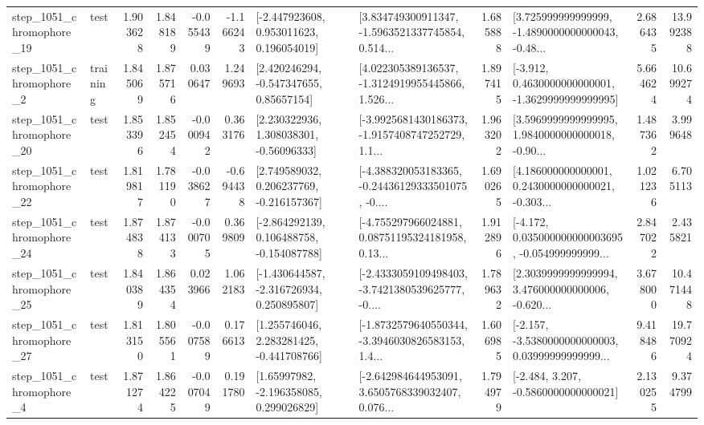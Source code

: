 \begin{tabular}{llrrrrllrlrr}
 step\_1051\_chromophore\_19 &      test &      1.903628 &    1.848189 &     -0.055439 & -1.166243 &    [-2.447923608, 0.953011623, 0.196054019] &  [3.834749300911347, -1.5963521337745854, 0.514... &       1.685888 &  [3.725999999999999, -1.4890000000000043, -0.48... &            2.686435 &         13.992388 \\
  step\_1051\_chromophore\_2 &  training &      1.845069 &    1.875716 &      0.030647 &  1.249693 &     [2.420246294, -0.547347655, 0.85657154] &  [4.022305389136537, -1.3124919955445866, 1.526... &       1.897415 &  [-3.912, 0.4630000000000001, -1.3629999999999995] &            5.664624 &         10.699274 \\
 step\_1051\_chromophore\_20 &      test &      1.853396 &    1.852454 &     -0.000942 &  0.363176 &     [2.230322936, 1.308038301, -0.56096333] &  [-3.9925681430186373, -1.9157408747252729, 1.1... &       1.963202 &  [3.5969999999999995, 1.9840000000000018, -0.90... &            1.487362 &          3.999648 \\
 step\_1051\_chromophore\_22 &      test &      1.819817 &    1.781190 &     -0.038627 & -0.694438 &    [2.749589032, 0.206237769, -0.216157367] &  [-4.388320053183365, -0.24436129333501075, -0.... &       1.690265 &  [4.186000000000001, 0.2430000000000021, -0.303... &            1.021236 &          6.705113 \\
 step\_1051\_chromophore\_24 &      test &      1.874838 &    1.874133 &     -0.000705 &  0.369809 &   [-2.864292139, 0.106488758, -0.154087788] &  [-4.755297966024881, 0.08751195324181958, 0.13... &       1.912896 &  [-4.172, 0.035000000000003695, -0.054999999999... &            2.847022 &          2.435821 \\
 step\_1051\_chromophore\_25 &      test &      1.840389 &    1.864354 &      0.023966 &  1.062183 &   [-1.430644587, -2.316726934, 0.250895807] &  [-2.4333059109498403, -3.7421380539625777, -0.... &       1.789632 &  [2.3039999999999994, 3.476000000000006, -0.620... &            3.678000 &         10.471448 \\
 step\_1051\_chromophore\_27 &      test &      1.813150 &    1.805561 &     -0.007589 &  0.176613 &    [1.255746046, 2.283281425, -0.441708766] &  [-1.8732579640550344, -3.3946030826583153, 1.4... &       1.606985 &  [-2.157, -3.5380000000000003, 0.03999999999999... &            9.418486 &         19.770924 \\
  step\_1051\_chromophore\_4 &      test &      1.871274 &    1.864225 &     -0.007049 &  0.191780 &     [1.65997982, -2.196358085, 0.299026829] &  [-2.642984644953091, 3.6505768339032407, 0.076... &       1.794979 &               [-2.484, 3.207, -0.5860000000000021] &            2.130255 &          9.374799 \\

\end{tabular}
